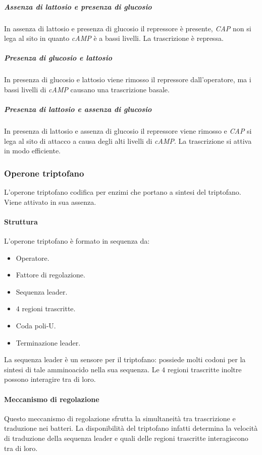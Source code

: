 				\subparagraph{Assenza di lattosio e presenza di glucosio}
				In assenza di lattosio e presenza di glucosio il repressore \`e presente, \emph{CAP} non si lega al sito in quanto \emph{cAMP} \`e a bassi livelli.
				La trascrizione \`e repressa.

				\subparagraph{Presenza di glucosio e lattosio}
				In presenza di glucosio e lattosio viene rimosso il repressore dall'operatore, ma i bassi livelli di \emph{cAMP} causano una trascrizione basale.

				\subparagraph{Presenza di lattosio e assenza di glucosio}
				In presenza di lattosio e assenza di glucosio il repressore viene rimosso e \emph{CAP} si lega al sito di attacco a causa degli alti livelli di \emph{cAMP}.
				La trascrizione si attiva in modo efficiente.

		\subsubsection{Operone triptofano}
		L'operone triptofano codifica per enzimi che portano a sintesi del triptofano.
		Viene attivato in sua assenza.

			\paragraph{Struttura}
			L'operone triptofano \`e formato in sequenza da:
			\begin{multicols}{2}
				\begin{itemize}
					\item Operatore.
					\item Fattore di regolazione.
					\item Sequenza leader.
					\item $4$ regioni trascritte.
					\item Coda poli-U.
					\item Terminazione leader.
				\end{itemize}
			\end{multicols}
			La sequenza leader \`e un sensore per il triptofano: possiede molti codoni per la sintesi di tale amminoacido nella sua sequenza.
			Le $4$ regioni trascritte inoltre possono interagire tra di loro.

			\paragraph{Meccanismo di regolazione}
			Questo meccanismo di regolazione sfrutta la simultaneit\`a tra trascrizione e traduzione nei batteri.
			La disponibilit\`a del triptofano infatti determina la velocit\`a di traduzione della sequenza leader e quali delle regioni trascritte interagiscono tra di loro.

